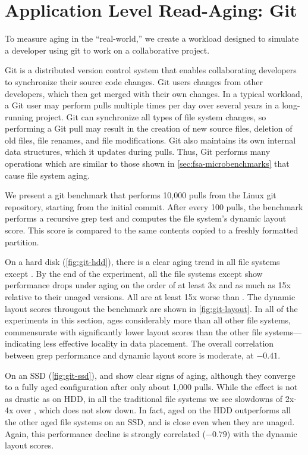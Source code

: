 \section{Application Level Read-Aging: Git}\label{sec:fsa-git}

To measure aging in the ``real-world,'' we create a workload designed to
simulate a developer using git to work on a collaborative project.

Git is a distributed version control system that enables collaborating
developers to synchronize their source code changes.  Git users 
changes from other developers, which then get merged with their own changes.
In a typical workload, a Git user may perform pulls multiple times per day over
several years in a long-running project.  Git can synchronize all types of file
system changes, so performing a Git pull may result in the creation of new
source files, deletion of old files, file renames, and file modifications.  Git
also maintains its own internal data structures, which it updates during pulls.
Thus, Git performs many operations which are similar to those shown in
\cref{sec:fsa-microbenchmarks} that cause file system aging.

We present a git benchmark that performs 10,000 pulls from the Linux git repository, starting
from the initial commit. After every 100 pulls, the benchmark performs a recursive grep
test and computes the file system's dynamic layout score.
This score is compared to the same contents copied to a freshly formatted partition.



On a hard disk (\cref{fig:git-hdd}), there is a clear aging trend in all
file systems except \betrfs.  By the end of the experiment, all the file
systems except \betrfs show performance drops under aging on the order of at
least 3x and as much as 15x relative to their unaged versions. All are at least
15x worse than \betrfs. The dynamic layout scores througout the benchmark are
shown in \cref{fig:git-layout}. In all of the experiments in this section,
\ftwofs ages considerably more than all other file systems, commensurate with
significantly lower layout scores than the other file systems---indicating less
effective locality in data placement. The overall correlation between grep
performance and dynamic layout score is moderate, at $-0.41$. 

On an SSD (\cref{fig:git-ssd}), \btrfs and \xfs show
clear signs of aging, although they converge to a fully aged configuration
after only about 1,000 pulls. While the effect is not as drastic as on HDD, in
all the traditional file systems we see slowdowns of 2x-4x over \betrfs, which
does not slow down.  In fact, aged \betrfs on the HDD outperforms all the other
aged file systems on an SSD, and is close even when they are unaged. Again,
this performance decline is strongly correlated ($-0.79$) with the dynamic
layout scores.

